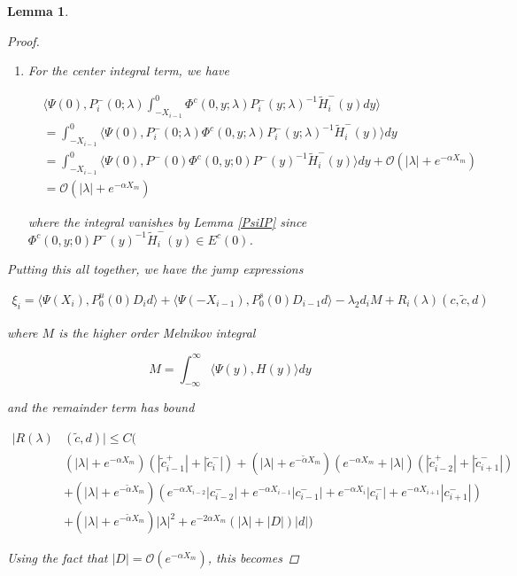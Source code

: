 \documentclass[12pt]{article}
\newtheorem{lemma}{Lemma}
\begin{document}
\begin{lemma}
\begin{proof}
\begin{enumerate}
\item For the center integral term, we have

\begin{align*}
&\langle \Psi(0), P_i^-(0; \lambda)
\int_{-X_{i-1}}^0 \Phi^c(0, y; \lambda) P_i^-(y; \lambda)^{-1} \tilde{H}_i^-(y) dy \rangle \\
&= \int_{-X_{i-1}}^0 \langle \Psi(0), P_i^-(0; \lambda) \Phi^c(0, y; \lambda) P_i^-(y; \lambda)^{-1} \tilde{H}_i^-(y) \rangle dy \\
&= \int_{-X_{i-1}}^0 \langle \Psi(0), P^-(0) \Phi^c(0, y; 0) P^-(y)^{-1} \tilde{H}_i^-(y) \rangle dy + \mathcal{O}(|\lambda| + e^{-\alpha X_m}) \\
&= \mathcal{O}(|\lambda| + e^{-\alpha X_m})
\end{align*}

where the integral vanishes by Lemma \ref{PsiIP} since $\Phi^c(0, y; 0) P^-(y)^{-1} \tilde{H}_i^-(y) \in E^c(0)$.

\end{enumerate}

Putting this all together, we have the jump expressions

\begin{align*}
\xi_i = \langle \Psi(X_i), P_0^u(0) D_i d \rangle
+ \langle \Psi(-X_{i-1}), P_0^s(0) D_{i-1} d \rangle 
- \lambda_2 d_i M + R_i(\lambda)(c, \tilde{c}, d)
\end{align*}

where $M$ is the higher order Melnikov integral

\[
M = \int_{-\infty}^\infty \langle \Psi(y), H(y) \rangle dy 
\]

and the remainder term has bound

\begin{align*}
|R(\lambda)&(\tilde{c}, d)| \leq C \Big( \\
&(|\lambda| + e^{-\alpha X_m})(|\tilde{c}_{i-1}^+| + |\tilde{c}_{i}^-|) + (|\lambda| + e^{-\tilde{\alpha} X_m})(e^{-\alpha X_m} + |\lambda|) ( |\tilde{c}_{i-2}^+| + |\tilde{c}_{i+1}^-|)  \\
&+ (|\lambda| + e^{-\tilde{\alpha} X_m})( e^{-\alpha X_{i-2}} |c_{i-2}^-| + e^{-\alpha X_{i-1}} |c_{i-1}^-| + e^{-\alpha X_i} |c_i^-| + e^{-\alpha X_{i+1}} |c_{i+1}^-|) \\
&+ (|\lambda| + e^{-\tilde{\alpha} X_m})|\lambda|^2 + e^{-2 \alpha X_m}(|\lambda| + |D|)|d| \Big)
\end{align*}

Using the fact that $|D| = \mathcal{O}(e^{-\alpha X_m})$, this becomes


\end{proof}
\end{lemma}
\end{document}
